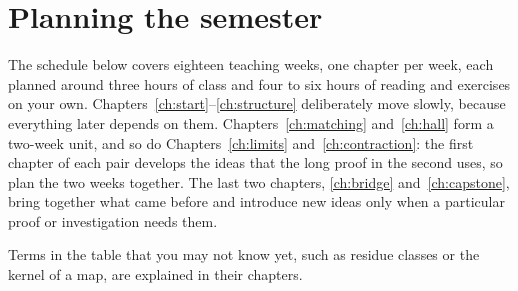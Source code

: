 \chapter*{Planning the semester}
The schedule below covers eighteen teaching weeks, one chapter per week, each planned around three hours of class and four to six hours of reading and exercises on your own. Chapters~\ref{ch:start}--\ref{ch:structure} deliberately move slowly, because everything later depends on them. Chapters~\ref{ch:matching} and~\ref{ch:hall} form a two-week unit, and so do Chapters~\ref{ch:limits} and~\ref{ch:contraction}: the first chapter of each pair develops the ideas that the long proof in the second uses, so plan the two weeks together. The last two chapters, \ref{ch:bridge} and~\ref{ch:capstone}, bring together what came before and introduce new ideas only when a particular proof or investigation needs them.

Terms in the table that you may not know yet, such as residue classes or the kernel of a map, are explained in their chapters.

